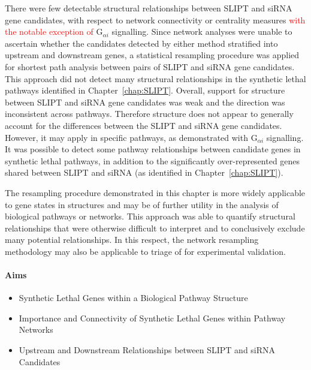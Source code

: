 There were few detectable structural relationships between \gls{SLIPT} and \gls{siRNA} gene candidates, with respect to network connectivity or \gls{centrality} measures \textcolor{red}{with the notable exception of} G$_{\alpha i}$ signalling. Since network analyses were unable to ascertain whether the candidates detected by either method stratified into upstream and downstream genes, %
%
a statistical resampling procedure was applied for \gls{shortest path} analysis between pairs of \gls{SLIPT} and \gls{siRNA} gene candidates. %
This approach did not detect many structural relationships in the \gls{synthetic lethal} \glspl{pathway} identified in Chapter~\ref{chap:SLIPT}. Overall, support for  structure between \gls{SLIPT} and \gls{siRNA} gene candidates was weak and the direction was inconsistent across \glspl{pathway}. Therefore  structure does not appear to generally account for the differences between the \gls{SLIPT} and \gls{siRNA} gene candidates. However, it may apply in specific \glspl{pathway}, as demonstrated with G$_{\alpha i}$ signalling. It was possible to detect some \gls{pathway} relationships between candidate genes in \gls{synthetic lethal} \glspl{pathway}, in addition to the significantly over-represented genes shared between \gls{SLIPT} and \gls{siRNA} (as identified in  Chapter~\ref{chap:SLIPT}).

The resampling procedure demonstrated in this chapter is more widely applicable to gene states in  structures and may be of further utility in the analysis of biological \glspl{pathway} or networks. This approach was able to quantify structural relationships that were otherwise difficult to interpret and to conclusively exclude many potential relationships. In this respect, the network resampling methodology may also be applicable to triage of  for experimental validation.

\clearpage

\iffalse
\paragraph{Aims}

  \begin{itemize}
   \item Synthetic Lethal Genes within a Biological Pathway Structure
   
   \bigskip
   
   \item Importance and Connectivity of Synthetic Lethal Genes within Pathway Networks
   
   \bigskip
   
   \item Upstream and Downstream Relationships between SLIPT and \gls{siRNA} Candidates
  \end{itemize}

